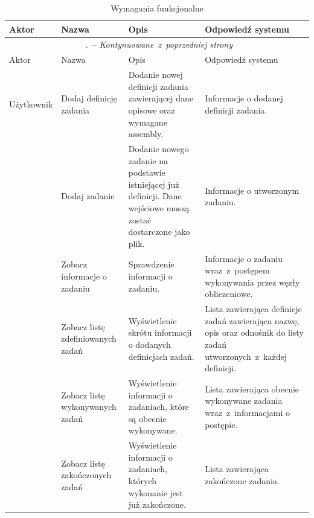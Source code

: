 \documentclass[a4paper,11pt,twoside]{report}
\renewcommand*{\thetable}{\arabic{chapter}.\arabic{table}}
\theoremstyle{definition}
\begin{document}
            \begin{longtable}{| p{} | p{} | p{} | p{} |}
                \caption{Wymagania funkcjonalne}
                \label{wymagania-funkcjonalne} \\
                \hline
                Aktor & Nazwa & Opis & Odpowiedź systemu \\ \hline
                \endfirsthead
                \multicolumn{4}{c}{\tablename\ \thetable\ -- \textit{Kontynuowane~z~poprzedniej strony}} \\
                \hline
                Aktor & Nazwa & Opis & Odpowiedź systemu \\ \hline
                \endhead
                
                Użytkownik
                & Dodaj definicję zadania
                & Dodanie nowej definicji zadania zawierającej dane opisowe oraz wymagane assembly.
                & Informacje o dodanej definicji zadania. \\ \cline{2-4} 
                
                & Dodaj zadanie
                & Dodanie nowego zadanie na podstawie istniejącej już definicji. Dane wejściowe muszą zostać dostarczone jako plik.
                & Informacje o utworzonym zadaniu. \\ \cline{2-4} 
                
                & Zobacz informacje o zadaniu
                & Sprawdzenie informacji o zadaniu.
                & Informacje o zadaniu wraz~z~postępem wykonywania przez węzły obliczeniowe. \\ \cline{2-4} 

                & Zobacz listę zdefiniowanych zadań
                & Wyświetlenie skrótu informacji o dodanych definicjach zadań.
                & Lista zawierająca definicje zadań zawierająca nazwę, opis oraz odnośnik do listy zadań utworzonych~z~każdej definicji. \\ \cline{2-4} 
                
                & Zobacz listę wykonywanych zadań   
                & Wyświetlenie informacji o zadaniach, które są obecnie wykonywane.                             
                & Lista zawierająca obecnie wykonywane zadania wraz~z~informacjami o postępie. \\ \cline{2-4} 
                
                & Zobacz listę zakończonych zadań  
                & Wyświetlenie informacji o zadaniach, których wykonanie jest już zakończone.
                & Lista zawierająca zakończone zadania. \\ \cline{2-4} 
                

\end{longtable}
\end{document}
